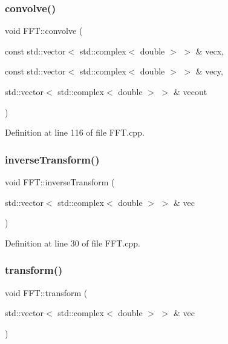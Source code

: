 \subsubsection{\texorpdfstring{convolve()}{convolve()}}
{\footnotesize\ttfamily void F\+F\+T\+::convolve (\begin{DoxyParamCaption}\item[{const std\+::vector$<$ std\+::complex$<$ double $>$ $>$ \&}]{vecx,  }\item[{const std\+::vector$<$ std\+::complex$<$ double $>$ $>$ \&}]{vecy,  }\item[{std\+::vector$<$ std\+::complex$<$ double $>$ $>$ \&}]{vecout }\end{DoxyParamCaption})}



Definition at line 116 of file F\+F\+T.\+cpp.

\mbox{\label{class_f_f_t_af95adcd45866ac6a6645da56f99b7578}} 
\subsubsection{\texorpdfstring{inverse\+Transform()}{inverseTransform()}}
{\footnotesize\ttfamily void F\+F\+T\+::inverse\+Transform (\begin{DoxyParamCaption}\item[{std\+::vector$<$ std\+::complex$<$ double $>$ $>$ \&}]{vec }\end{DoxyParamCaption})}



Definition at line 30 of file F\+F\+T.\+cpp.

\mbox{\label{class_f_f_t_acb77aec27c2395b07f4649422341b4aa}} 
\subsubsection{\texorpdfstring{transform()}{transform()}}
{\footnotesize\ttfamily void F\+F\+T\+::transform (\begin{DoxyParamCaption}\item[{std\+::vector$<$ std\+::complex$<$ double $>$ $>$ \&}]{vec }\end{DoxyParamCaption})}



